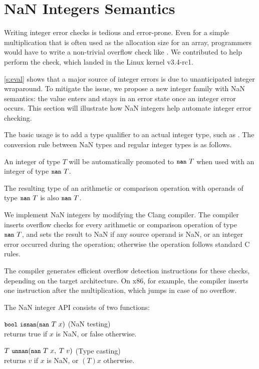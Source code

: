 \section{NaN Integers Semantics}
\label{s:miti}

Writing integer error checks is tedious and error-prone.
Even for a simple multiplication  that is often used
as the allocation size for an array, programmers would
have to write a non-trivial overflow check like .  We contributed 
to help perform the check, which landed in the Linux kernel v3.4-rc1.
\fi

\autoref{s:eval} shows that a major source of integer errors is due
to unanticipated integer wraparound.  To mitigate the issue, we
propose a new integer family with NaN semantics: the value enters
and stays in an error state once an integer error occurs.
%
This section will illustrate how NaN integers help automate integer
error checking.

The basic usage is to add a type qualifier 
to an actual integer type, such as . The conversion
rule between NaN types and regular integer types is as follows.
\begin{CompactItemize}
\item
An integer of type $T$ will be automatically promoted to $\cc{nan}\ T$
when used with an integer of type $\cc{nan}\ T$.
\item
The resulting type of an arithmetic or comparison operation with
operands of type $\cc{nan}\ T$ is also $\cc{nan}\ T$.
\end{CompactItemize}

We implement NaN integers by modifying the Clang compiler.
The compiler inserts overflow checks for every arithmetic or
comparison operation of type $\cc{nan}\ T$, and sets the result to
NaN if any source operand is NaN, or an integer error occurred
during the operation; otherwise the operation follows standard C rules.

The compiler generates efficient overflow detection instructions
for these checks, depending on the target architecture. On x86, for example,
the compiler inserts one  instruction after the 
multiplication, which jumps in case of no overflow.

The NaN integer API consists of two functions:
\begin{CompactItemize}
\item
$\cc{bool}\ \cc{isnan}(\cc{nan}\ T\; x)$ \hfill (NaN testing) \\
returns true if $x$ is NaN, or false otherwise.
\item
$T\ \cc{unnan}(\cc{nan}\ T\; x,\; T\; v)$ \hfill (Type casting) \\
returns $v$ if $x$ is NaN, or $(T)x$ otherwise.
\end{CompactItemize}

